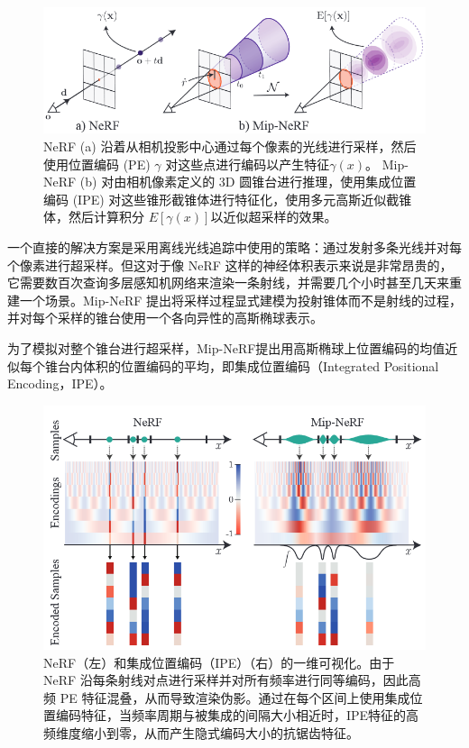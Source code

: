 \begin{figure}[ht]
    \centering
    \includegraphics[width=\textwidth]{undergraduate-thesis/images/related-work/mipnerf-cone.png}
    \caption{NeRF (a) 沿着从相机投影中心通过每个像素的光线进行采样，然后使用位置编码 (PE) $\gamma$ 对这些点进行编码以产生特征$\gamma(x)$。 Mip-NeRF (b) 对由相机像素定义的 3D 圆锥台进行推理，使用集成位置编码 (IPE) 对这些锥形截锥体进行特征化，使用多元高斯近似截锥体，然后计算积分 $E[\gamma(x)]$以近似超采样的效果\cite{barron_mip-nerf_2021}。}
    \label{fig:related-work mip-nerf cone tracing}
\end{figure}

一个直接的解决方案是采用离线光线追踪中使用的策略：通过发射多条光线并对每个像素进行超采样。但这对于像 NeRF 这样的神经体积表示来说是非常昂贵的，它需要数百次查询多层感知机网络来渲染一条射线，并需要几个小时甚至几天来重建一个场景。Mip-NeRF \cite{barron_mip-nerf_2021}提出将采样过程显式建模为投射锥体而不是射线的过程，并对每个采样的锥台使用一个各向异性的高斯椭球表示。

为了模拟对整个锥台进行超采样，Mip-NeRF提出用高斯椭球上位置编码的均值近似每个锥台内体积的位置编码的平均，即集成位置编码（Integrated Positional Encoding，IPE）。
\begin{figure}[ht]
    \centering
    \includegraphics[width=\textwidth]{undergraduate-thesis/images/related-work/mipnerf-encoding.png}
    \caption{NeRF（左）和集成位置编码（IPE）（右）的一维可视化。由于 NeRF 沿每条射线对点进行采样并对所有频率进行同等编码，因此高频 PE 特征混叠，从而导致渲染伪影。通过在每个区间上使用集成位置编码特征，当频率周期与被集成的间隔大小相近时，IPE特征的高频维度缩小到零，从而产生隐式编码大小的抗锯齿特征。\cite{barron_mip-nerf_2021}}
    \label{fig:related-work mip-nerf encoding}
\end{figure}

